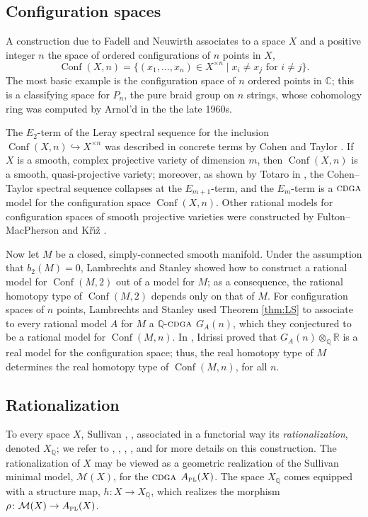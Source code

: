 \documentclass{article}
\numberwithin{equation}{section}
\theoremstyle{definition}
\newcommand{\Q}{\mathbb{Q}}
\newcommand{\R}{\mathbb{R}}
\renewcommand{\C}{\mathbb{C}}
\newcommand{\M}{\mathcal{M}}
\newcommand{\cdga}{\ensuremath{\textsc{cdga}}}
\DeclareMathOperator{\Conf}{Conf}
\newcommand{\inj}{\hookrightarrow}
\newcommand{\apl}{A_{\scriptscriptstyle{{\rm PL}}}}
\begin{document}
\subsection{Configuration spaces}
\label{subsec:config}
A construction due to Fadell and Neuwirth associates 
to a space $X$ and a positive integer $n$ the space of 
ordered configurations of $n$ points in $X$, 
\begin{equation}
\label{eq:conf gamma}
\Conf(X,n) = \{ (x_1, \dots , x_n) \in X^{\times n} 
\mid x_i \ne x_j \text{ for } i\ne j\}.
\end{equation}
The most basic example is the configuration space 
of $n$ ordered points in $\C$; this is a classifying 
space for $P_n$, the pure braid group on $n$ strings, 
whose cohomology ring was computed by Arnol'd in the 
the late 1960s.  

The $E_2$-term of the Leray spectral sequence for 
the inclusion $\Conf(X,n)\inj X^{\times n}$ was described in 
concrete terms by Cohen and Taylor \cite{CT78}. 
If $X$ is a smooth, complex projective variety 
of dimension $m$, then $\Conf(X,n)$ is a smooth, 
quasi-projective variety; moreover, as shown by Totaro in \cite{To96}, 
the Cohen--Taylor spectral sequence collapses at the 
$E_{m+1}$-term, and the $E_m$-term is a $\cdga$ model 
for the configuration space $\Conf(X,n)$. Other rational 
models for configuration spaces of smooth projective varieties 
were constructed by Fulton--MacPherson \cite{FMac} and 
K\v{r}\'{\i}\v{z} \cite{Kriz}. 

Now let $M$ be a closed, simply-connected smooth manifold. 
Under the assumption that $b_2(M)=0$, Lambrechts and 
Stanley \cite{LS-aif} showed how to construct a rational model 
for $\Conf(M,2)$ out of a model for $M$; as a consequence, 
the rational homotopy type of $\Conf(M,2)$ depends only on that of $M$.
For configuration spaces of $n$ points, Lambrechts and 
Stanley \cite{LS-asens} used Theorem \ref{thm:LS} to 
associate to every rational model $A$ for $M$ a $\Q$-$\cdga$ 
$G_A(n)$, which they conjectured to be a rational model for 
$\Conf(M,n)$.  In \cite{Idrissi}, Idrissi proved that 
$G_A(n)\otimes_{\Q} \R$ is a real model for the configuration space;  
thus, the real homotopy type of $M$ determines the real homotopy 
type of $\Conf(M,n)$, for all $n$.

\subsection{Rationalization}
\label{subsec:rationalization}
To every space $X$, Sullivan  \cite{Sullivan74}, \cite{Sullivan77}, \cite{Sullivan05} 
associated in a functorial way its {\em rationalization}, denoted $X_{\Q}$; 
we refer to \cite{BG76}, \cite{FHT2}, \cite{FH17}, \cite{RWZ}, and \cite{Iv} for 
more details on this construction. The rationalization of $X$ may be 
viewed as a geometric realization 
of the Sullivan minimal model, $\M(X)$, for the $\cdga$ $\apl(X)$. 
The space $X_{\Q}$  comes equipped with a structure map, $h\colon X\to X_{\Q}$, 
which realizes the morphism $\rho\colon \M(X)\to \apl(X)$. 
\end{document}
